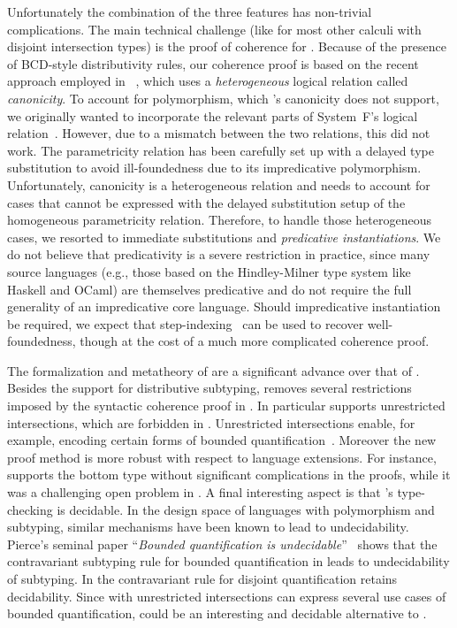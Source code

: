 Unfortunately the combination of the three features has non-trivial
complications. The main technical challenge (like for most other
calculi with disjoint intersection types) is the proof of coherence
for \fnamee. Because of the presence of BCD-style distributivity
rules, our coherence proof is based on the recent approach employed in
\namee~\cite{bi_et_al:LIPIcs:2018:9227}, which uses a
\emph{heterogeneous} logical relation called \emph{canonicity}. To account for polymorphism,
which \namee's canonicity does not support, we originally wanted
to incorporate the relevant parts of System~F's logical relation~\cite{reynolds1983types}.
However, due to a mismatch between the two relations, this did not work. The
parametricity relation has been carefully set up with a delayed type
substitution to avoid ill-foundedness due to its impredicative polymorphism.
Unfortunately, canonicity is a heterogeneous relation and needs to account for
cases that cannot be expressed with the delayed substitution setup of the
homogeneous parametricity relation. Therefore, to handle those heterogeneous
cases, we resorted to immediate substitutions and 
\emph{predicative instantiations}.
We do not believe that predicativity is a severe restriction in practice, since many source
languages (e.g., those based on the Hindley-Milner type system like Haskell and
OCaml) are themselves predicative and do not require the full generality of an
impredicative core language. Should impredicative instantiation be required,
we expect that step-indexing~\cite{ahmed2006step} can be used to recover well-foundedness, though
at the cost of a much more complicated coherence proof.

The formalization and metatheory of \fnamee are a significant advance over that of
\fname. Besides the support for distributive subtyping, \fnamee removes 
several restrictions imposed by the syntactic coherence
proof in \fname. In particular \fnamee supports unrestricted
intersections, which are forbidden in \fname. Unrestricted
intersections enable, for example, encoding certain forms of 
bounded quantification~\cite{pierce1991programming}.
Moreover the new proof method is more robust
with respect to language extensions. For instance, \fnamee supports the bottom
type without significant complications in the proofs, while it was a challenging
open problem in \fname.
A final interesting aspect is that \fnamee's type-checking is decidable. In the
design space of languages with polymorphism and subtyping, similar mechanisms
have been known to lead to undecidability. Pierce's seminal paper
``\emph{Bounded quantification is undecidable}''~\cite{pierce1994bounded} shows
that the contravariant subtyping rule for bounded quantification in
\fsub leads to undecidability of subtyping.  In \fnamee the
contravariant rule for disjoint quantification retains decidability. 
Since with unrestricted intersections \fnamee can express several
use cases of bounded quantification, \fnamee could be an interesting and
decidable alternative to \fsub.

